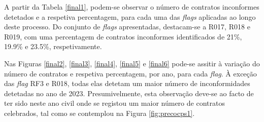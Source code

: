 A partir da Tabela \ref{final1}, podem-se observar o número de contratos inconformes detetados e a respetiva percentagem, para cada uma das \textit{flags} aplicadas ao longo deste processo. Do conjunto de \textit{flags} apresentadas, destacam-se a R017, R018 e R019, com uma percentagem de contratos inconformes identificados de 21\%, 19.9\% e 23.5\%, respetivamente. 

Nas Figuras \ref{final2}, \ref{final3}, \ref{final4}, \ref{final5} e \ref{final6} pode-se assitir à variação do número de contratos e respetiva percentagem, por ano, para cada \textit{flag}. À exceção das \textit{flag} RF3 e R018, todas elas detetam um maior número de inconformidades detetadas no ano de 2023. Presumivelmente, esta observação deve-se ao facto de ter sido neste ano civil onde se registou um maior número de contratos celebrados, tal como se contemplou na Figura \ref{fig:precocps1}.


\begin{table}[ht]
	\centering
	\renewcommand{\arraystretch}{1.5}
	\setlength{\tabcolsep}{15pt}
	\caption{Número de contratos inconformes detetados para cada indicador construído.}
	\label{final1}
\end{table}



